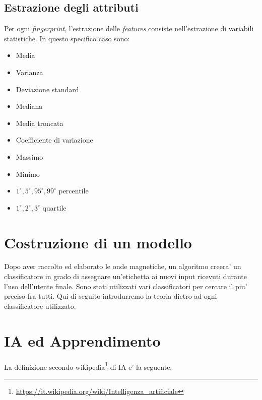 \subsection{Estrazione degli attributi}
Per ogni \textit{fingerprint}, l'estrazione delle \textit{features} consiste nell'estrazione di variabili statistiche. In questo specifico caso sono:
\begin{itemize}
	\item Media
	\item Varianza
	\item Deviazione standard
	\item Mediana
	\item Media troncata
	\item Coefficiente di variazione
	\item Massimo
	\item Minimo
	\item $ 1^{\circ}, 5^{\circ}, 95^{\circ}, 99^{\circ} $ percentile
	\item $ 1^{\circ}, 2^{\circ}, 3^{\circ} $ quartile
\end{itemize}





\section{Costruzione di un modello}

Dopo aver raccolto ed elaborato le onde magnetiche, un algoritmo creera' un classificatore in grado di assegnare un'etichetta ai nuovi input ricevuti durante l'uso dell'utente finale.
Sono stati utilizzati vari classificatori per cercare il piu' preciso fra tutti. Qui di seguito introdurremo la teoria dietro ad ogni classificatore utilizzato.
\newpage
\section{IA ed Apprendimento}
La definizione secondo wikipedia\footnote{\url{https://it.wikipedia.org/wiki/Intelligenza_artificiale}} di IA e' la seguente:\\

